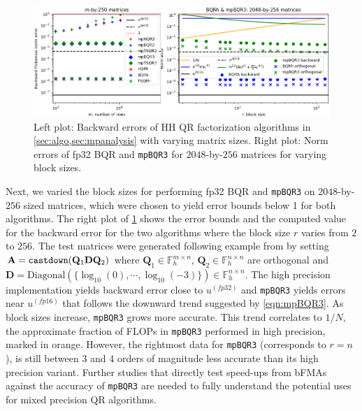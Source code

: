 \documentclass[review,onefignum,onetabnum]{siamart190516}
\newcommand{\F}{\mathbb{F}}
\newcommand{\bb}[1]{\mathbf{#1}}
\begin{document}
\begin{figure}[h!]
	\centering
	\vspace{-10pt}
	\includegraphics[width=\textwidth]{../figures/fig2a.png}
	\vspace{-22pt}
	\caption{\label{fig:sizemp3}Left plot: Backward errors of HH QR factorization algorithms in \cref{sec:algo,sec:mpanalysis} with varying matrix sizes.
		Right plot: Norm errors of fp32 BQR and {\tt mpBQR3} for $2048$-by-$256$ matrices for varying block sizes.}
	\vspace{-10pt}
\end{figure} 

Next, we varied the block sizes for performing fp32 BQR and {\tt mpBQR3} on $2048$-by-$256$ sized matrices, which were chosen to yield error bounds below 1 for both algorithms.
The right plot of \cref{fig:sizemp3} shows the error bounds and the computed value for the backward error for the two algorithms where the block size $r$ varies from $2$ to $256$. 
The test matrices were generated following example from \cite{Blanchard2020} by setting $\bb{A}={\tt castdown}(\bb{Q}_1\bb{D}\bb{Q}_2)$ where $\bb{Q}_1\in\F_h^{m\times n}$, $\bb{Q}_2\in\F_h^{n\times n}$ are orthogonal and $\bb{D}=\mathrm{Diagonal}(\{\log_{10}(0),\cdots, \log_{10}(-3)\})\in\F_h^{n\times n}$.  
The high precision implementation yields backward error close to $u^{(fp32)}$ and {\tt mpBQR3} yields errors near $u^{(fp16)}$ that follows the downward trend suggested by \cref{eqn:mpBQR3}.
As block sizes increase, {\tt mpBQR3} grows more accurate. 
This trend correlates to $1/N$, the approximate fraction of FLOPs in {\tt mpBQR3} performed in high precision, marked in orange.
However, the rightmost data for {\tt mpBQR3} (corresponds to $r=n$), is still between 3 and 4 orders of magnitude less accurate than its high precision variant. 
Further studies that directly test speed-ups from bFMAs against the accuracy of {\tt mpBQR3} are needed to fully understand the potential uses for mixed precision QR algorithms.
\end{document}
